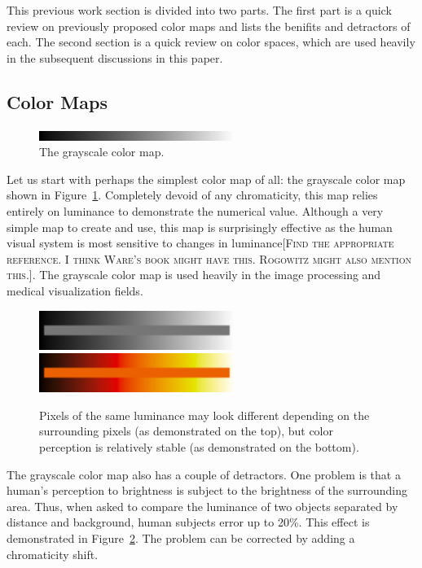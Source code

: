 \documentclass[twocolumn]{article}
\newcommand{\sticky}[1]{\textsc{[#1]}}
\begin{document}
This previous work section is divided into two parts.  The first part is a
quick review on previously proposed color maps and lists the benifits and
detractors of each.  The second section is a quick review on color spaces,
which are used heavily in the subsequent discussions in this paper.

\subsection{Color Maps}
\label{sec:PreviousWork:ColorMaps}

\begin{figure}
  \centering
  \includegraphics[width=2.5in]{images/GrayscaleBar}
  \caption{The grayscale color map.}
  \label{fig:GrayscaleColorMap}
\end{figure}
Let us start with perhaps the simplest color map of all: the grayscale
color map shown in Figure~\ref{fig:GrayscaleColorMap}.  Completely devoid
of any chromaticity, this map relies entirely on luminance to demonstrate
the numerical value.  Although a very simple map to create and use, this
map is surprisingly effective as the human visual system is most sensitive
to changes in luminance\sticky{Find the appropriate reference.  I think
  Ware's book might have this.  Rogowitz might also mention this.}.  The
grayscale color map is used heavily in the image processing and medical
visualization fields.

\begin{figure}
  \centering
  \includegraphics[width=2.5in]{images/GrayscaleLocality}
  \includegraphics[width=2.5in]{images/BlackBodyLocality}
  \caption{Pixels of the same luminance may look different depending on the
    surrounding pixels (as demonstrated on the top), but color perception
    is relatively stable (as demonstrated on the bottom).}
  \label{fig:GrayscaleLocality}
\end{figure}
The grayscale color map also has a couple of detractors.  One problem is
that a human's perception to brightness is subject to the brightness of the
surrounding area.  Thus, when asked to compare the luminance of two objects
separated by distance and background, human subjects error up to 20\%.
This effect is demonstrated in Figure~\ref{fig:GrayscaleLocality}.  The
problem can be corrected by adding a chromaticity shift.
\end{document}
